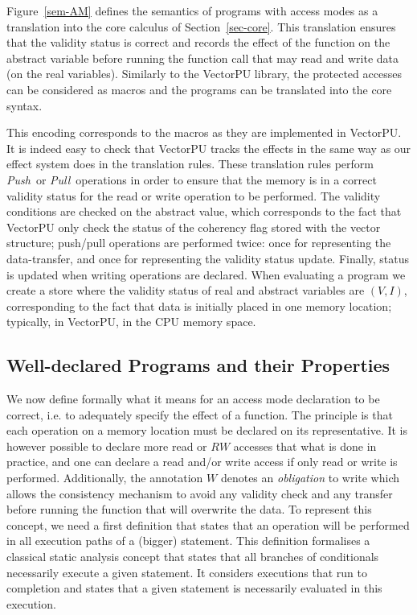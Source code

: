 \documentclass[preprint,12pt]{elsarticle}
\newcommand{\symb}[1]{\textit{#1}}
\newcommand{\Push}{\symb{Push}}
\newcommand{\Pull}{\symb{Pull}}
\begin{document}
Figure~\ref{sem-AM} defines the semantics of programs with access modes as a translation 
into the core calculus of Section~\ref{sec-core}. 
This translation
ensures that the validity status is correct and records the effect of the function on the 
abstract variable before running the function call that may 
read and write data (on the real variables).  Similarly to the VectorPU library, the 
protected accesses can be 
considered as macros and the programs can be translated into the 
core syntax.

This encoding corresponds  to the macros as they are implemented in VectorPU.  
It is indeed easy 
to check that VectorPU tracks the effects in 
the same way as our effect system  does in the translation rules. These translation 
rules  perform \Push\ or 
\Pull\ operations in order to ensure that the memory is in a correct validity status for 
the read or write operation to be performed.
The validity conditions are checked on the abstract value, which corresponds to the fact that VectorPU only check the status of the coherency flag stored with the vector structure; push/pull operations are performed twice: once for representing the data-transfer, and once for representing the validity status update. Finally, status is updated when writing operations are declared.
When evaluating a program we create a store where the validity status of real and 
abstract variables are $(V,I)$, corresponding to the fact that data is 
initially placed in one memory location; typically, in VectorPU, in the CPU memory space.
%
%


\subsection{Well-declared Programs and their Properties}
We now define formally what it means for an access mode declaration to be correct, i.e. 
to adequately specify the effect of a function. The principle is that each operation on a 
memory location must be declared on its representative. It is however possible to declare 
more read or $RW$ accesses that what is done in practice, and one can declare a read 
and/or write 
access if only read or write is performed. Additionally, the annotation $W$ denotes an 
\emph{obligation} to write which allows the consistency mechanism to avoid any validity 
check and any transfer before running the function that will overwrite the data. 
To represent this concept, we need a first definition that states that an operation will be performed in all execution paths of a (bigger) statement. This 
definition 
formalises a classical static analysis concept that states that all branches of 
conditionals necessarily execute a given statement. It considers executions that run to 
completion and states that a given statement is necessarily evaluated in this execution.
\end{document}
